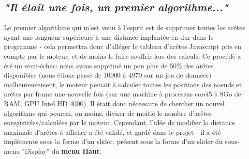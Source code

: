 \documentclass[12pt]{report}
\begin{document}
\begin{spacing}{1.2}
\subsection{\textit{"Il était une fois, un premier algorithme..."}}
Le premier algorithme qui m'est venu à l'esprit est de supprimer toutes les arêtes ayant une longueur supérieure à une distance implantée en dur dans le programme - cela permettra donc d'alléger le tableau d'arêtes Javascript pris en compte par le moteur, et de moins le faire souffrir lors des calculs.
\newline
Ce procédé a été un semi-échec: nous avons supprimé un peu plus de 50\% des arêtes disponibles (nous étions passé de 10000 à 4970 sur un jeu de données) - malheureusement, le moteur peinait à calculer toutes les positions des noeuds et arêtes par frame une nouvelle fois (sur une machine à processus corei5 à 8Go de RAM, GPU Intel HD 4000).
\newline
Il était donc nécessaire de chercher un nouvel algorithme qui pourrai, au moins, diviser de moitié le nombre d'arêtes enregistrées/calculées par le moteur. Cependant, l'idée de modifier la distance maximale d'arêtes à afficher a été validé, et gardé dans le projet - il a été implémenté sous la forme d'un slider, présent sous la forme d'un slider du sous-menu "Display" du \textbf{menu Haut}.


\end{spacing}
\end{document}

